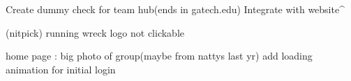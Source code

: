 Create dummy check for team hub(ends in gatech.edu)
Integrate with website^

(nitpick) running wreck logo not clickable

home page :
    big photo of group(maybe from nattys last yr)
    add loading animation for initial login




